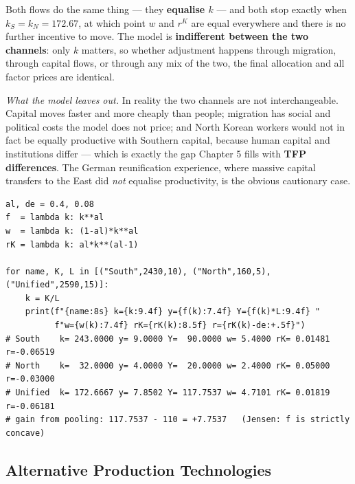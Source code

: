 \documentclass[12pt, letterpaper]{article}
\begin{document}
\begin{tcolorbox}[oddbox,title={Problem 4.3 \quad Korean Unification}]
\begin{enumerate}
Both flows do the same thing --- they \textbf{equalise $k$} --- and both stop exactly when
$k_S = k_N = 172.67$, at which point $w$ and $r^K$ are equal everywhere and there is no
further incentive to move. The model is \textbf{indifferent between the two channels}: only
$k$ matters, so whether adjustment happens through migration, through capital flows, or
through any mix of the two, the final allocation and all factor prices are identical.

\emph{What the model leaves out.} In reality the two channels are not interchangeable.
Capital moves faster and more cheaply than people; migration has social and political costs
the model does not price; and North Korean workers would not in fact be equally productive
with Southern capital, because human capital and institutions differ --- which is exactly the
gap Chapter 5 fills with \textbf{TFP differences}. The German reunification experience, where
massive capital transfers to the East did \emph{not} equalise productivity, is the obvious
cautionary case.

\end{enumerate}

\begin{tcolorbox}[theorybox,title={Verification code (executed)}]
\footnotesize
\begin{verbatim}
al, de = 0.4, 0.08
f  = lambda k: k**al
w  = lambda k: (1-al)*k**al
rK = lambda k: al*k**(al-1)

for name, K, L in [("South",2430,10), ("North",160,5), ("Unified",2590,15)]:
    k = K/L
    print(f"{name:8s} k={k:9.4f} y={f(k):7.4f} Y={f(k)*L:9.4f} "
          f"w={w(k):7.4f} rK={rK(k):8.5f} r={rK(k)-de:+.5f}")
# South    k= 243.0000 y= 9.0000 Y=  90.0000 w= 5.4000 rK= 0.01481 r=-0.06519
# North    k=  32.0000 y= 4.0000 Y=  20.0000 w= 2.4000 rK= 0.05000 r=-0.03000
# Unified  k= 172.6667 y= 7.8502 Y= 117.7537 w= 4.7101 rK= 0.01819 r=-0.06181
# gain from pooling: 117.7537 - 110 = +7.7537   (Jensen: f is strictly concave)
\end{verbatim}
\end{tcolorbox}
\end{tcolorbox}

\subsection{Alternative Production Technologies}
\end{document}
